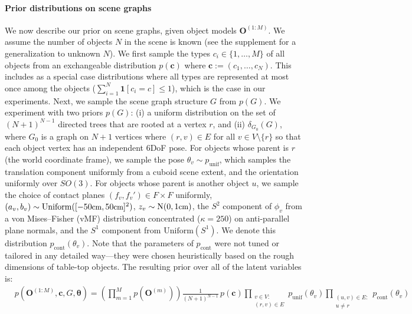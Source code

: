 \paragraph{Prior distributions on scene graphs}
We now describe our prior on scene graphs, given object models $\mathbf{O}^{(1:M)}$.
We assume the number of objects $N$ in the scene is known (see the supplement for a generalization to unknown $N$).
We first sample the types $c_i \in \{1, \ldots, M\}$ of all objects from an exchangeable distribution $p(\mathbf{c})$ where $\mathbf{c} := (c_1, \ldots, c_N)$.
This includes as a special case distributions where all types are represented at most once among the objects ($\sum_{i=1}^N \mathbf{1}[c_i = c] \le 1$), which is the case in our experiments.
Next, we sample the scene graph structure $G$ from $p(G)$.
We experiment with two priors $p(G)$:
(i) a uniform distribution on the set of $(N+1)^{N-1}$ directed trees that are rooted at a vertex $r$,
and (ii) $\delta_{G_0}(G)$, where $G_0$ is a graph on $N+1$ vertices where $(r, v) \in E$ for all $v \in V \setminus \{r\}$ so that each object vertex has an independent 6DoF pose.
For objects whose parent is $r$ (the world coordinate frame), we sample the pose $\theta_v \sim p_{\mathrm{unif}}$, which samples the translation component uniformly from a cuboid scene extent, and the orientation uniformly over $SO(3)$.
For objects whose parent is another object $u$, we sample the choice of contact planes $(f_v, f_v') \in F \times F$ uniformly, $(a_v, b_v) \sim \mathrm{Uniform}([-50{\small\mbox{cm}}, 50{\small\mbox{cm}}]^2)$,
$z_v \sim \mathrm{N}(0, 1{\small\mbox{cm}})$,
the $S^2$ component of $\phi_v$ from a von Mises--Fisher (vMF) distribution concentrated ($\kappa = 250$) on anti-parallel plane normals,
and the $S^1$ component from $\mathrm{Uniform}(S^1)$.
We denote this distribution $p_{\mathrm{cont}}(\theta_v)$.
Note that the parameters of $p_{\mathrm{cont}}$ were not tuned or tailored in any detailed way---they were chosen heuristically based on the rough dimensions of table-top objects.
The resulting prior over all of the latent variables is:
\begin{align}
&p(\mathbf{O}^{(1:M)}, \mathbf{c}, G, \bm{\theta}) =
\displaystyle \left(\prod_{m=1}^M p(\mathbf{O}^{(m)}) \right)
\frac{1}{(N+1)^{N-1}}
\,
p(\mathbf{c})
    \prod_{\substack{v \in V: \\ (r, v) \in E}}
    p_{\mathrm{unif}}(\theta_v)
    \prod_{\substack{(u, v) \in E: \\ u \neq r}}
    p_{\mathrm{cont}}(\theta_v)
\label{eq:prior}
\end{align}

